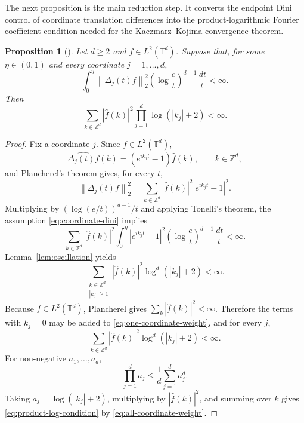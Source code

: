 \documentclass[11pt,reqno]{amsart}
\numberwithin{equation}{section}
\theoremstyle{plain}
\newtheorem{proposition}[theorem]{Proposition}
\theoremstyle{definition}
\theoremstyle{remark}
\newcommand{\T}{\mathbb T}
\newcommand{\Z}{\mathbb Z}
\newcommand{\dd}{\,d}
\newcommand{\wh}{\widehat}
\newcommand{\norm}[1]{\left\lVert #1\right\rVert}
\newcommand{\abs}[1]{\left\lvert #1\right\rvert}
\begin{document}
The next proposition is the main reduction step. It converts the endpoint Dini control of coordinate translation differences into the product-logarithmic Fourier coefficient condition needed for the Kaczmarz--Kojima convergence theorem.

\begin{proposition}[]\label{prop:difference-to-product}
Let $d\ge2$ and $f\in L^2(\T^d)$. Suppose that, for some $\eta\in(0,1)$ and every coordinate $j=1,\ldots,d$,
\begin{equation}\label{eq:coordinate-dini}
 \int_0^\eta \norm{\Delta_j(t)f}_{2}^{2}\left(\log\frac et\right)^{d-1}\frac{\dd t}{t}<\infty .
\end{equation}
Then
\begin{equation}\label{eq:product-log-condition}
 \sum_{k\in\Z^d}\abs{\wh f(k)}^2\prod_{j=1}^d\log(\abs{k_j}+2)<\infty .
\end{equation}
\end{proposition}

\begin{proof}
Fix a coordinate $j$. Since $f\in L^2(\T^d)$,
\[
 \widehat{\Delta_j(t)f}(k)=(e^{ik_jt}-1)\wh f(k),\qquad k\in\Z^d,
\]
and Plancherel's theorem gives, for every $t$,
\[
 \norm{\Delta_j(t)f}_2^2
 =\sum_{k\in\Z^d}\abs{\wh f(k)}^2\abs{e^{ik_jt}-1}^2.
\]
Multiplying by $(\log(e/t))^{d-1}/t$ and applying Tonelli's theorem, the assumption \eqref{eq:coordinate-dini} implies
\begin{equation}\label{eq:tonelli-coordinate}
 \sum_{k\in\Z^d}\abs{\wh f(k)}^2
 \int_0^\eta \abs{e^{ik_jt}-1}^2\left(\log\frac et\right)^{d-1}\frac{\dd t}{t}<\infty .
\end{equation}
Lemma~\ref{lem:oscillation} yields
\begin{equation}\label{eq:one-coordinate-weight}
 \sum_{\substack{k\in\Z^d\\ \abs{k_j}\ge1}}\abs{\wh f(k)}^2\log^d(\abs{k_j}+2)<\infty .
\end{equation}
Because $f\in L^2(\T^d)$, Plancherel gives $\sum_k\abs{\wh f(k)}^2<\infty$. Therefore the terms with $k_j=0$ may be added to \eqref{eq:one-coordinate-weight}, and for every $j$,
\begin{equation}\label{eq:all-coordinate-weight}
 \sum_{k\in\Z^d}\abs{\wh f(k)}^2\log^d(\abs{k_j}+2)<\infty .
\end{equation}
For non-negative $a_1,\ldots,a_d$,
\[
 \prod_{j=1}^d a_j\le \frac1d\sum_{j=1}^d a_j^d.
\]
Taking $a_j=\log(\abs{k_j}+2)$, multiplying by $\abs{\wh f(k)}^2$, and summing over $k$ gives \eqref{eq:product-log-condition} by \eqref{eq:all-coordinate-weight}.
\end{proof}
\end{document}
